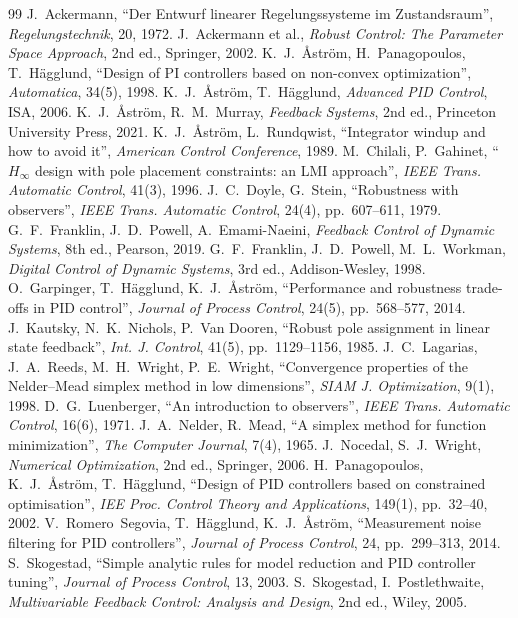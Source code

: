\documentclass[10pt,a4paper]{article}
\begin{document}
\begin{thebibliography}{99}\small
{} J.~Ackermann, ``Der Entwurf linearer Regelungssysteme im Zustandsraum'', \emph{Regelungstechnik}, 20, 1972.
 J.~Ackermann et al., \emph{Robust Control: The Parameter Space Approach}, 2nd ed., Springer, 2002.
 K.~J.~{\AA}str{\"o}m, H.~Panagopoulos, T.~H{\"a}gglund, ``Design of PI controllers based on non-convex optimization'', \emph{Automatica}, 34(5), 1998.
 K.~J.~{\AA}str{\"o}m, T.~H{\"a}gglund, \emph{Advanced PID Control}, ISA, 2006.
 K.~J.~{\AA}str{\"o}m, R.~M.~Murray, \emph{Feedback Systems}, 2nd ed., Princeton University Press, 2021.
 K.~J.~{\AA}str{\"o}m, L.~Rundqwist, ``Integrator windup and how to avoid it'', \emph{American Control Conference}, 1989.
 M.~Chilali, P.~Gahinet, ``$H_\infty$ design with pole placement constraints: an LMI approach'', \emph{IEEE Trans. Automatic Control}, 41(3), 1996.
 J.~C.~Doyle, G.~Stein, ``Robustness with observers'', \emph{IEEE Trans. Automatic Control}, 24(4), pp.~607--611, 1979.
 G.~F.~Franklin, J.~D.~Powell, A.~Emami-Naeini, \emph{Feedback Control of Dynamic Systems}, 8th ed., Pearson, 2019.
 G.~F.~Franklin, J.~D.~Powell, M.~L.~Workman, \emph{Digital Control of Dynamic Systems}, 3rd ed., Addison-Wesley, 1998.
 O.~Garpinger, T.~H{\"a}gglund, K.~J.~{\AA}str{\"o}m, ``Performance and robustness trade-offs in PID control'', \emph{Journal of Process Control}, 24(5), pp.~568--577, 2014.
 J.~Kautsky, N.~K.~Nichols, P.~Van Dooren, ``Robust pole assignment in linear state feedback'', \emph{Int. J. Control}, 41(5), pp.~1129--1156, 1985.
 J.~C.~Lagarias, J.~A.~Reeds, M.~H.~Wright, P.~E.~Wright, ``Convergence properties of the Nelder--Mead simplex method in low dimensions'', \emph{SIAM J. Optimization}, 9(1), 1998.
 D.~G.~Luenberger, ``An introduction to observers'', \emph{IEEE Trans. Automatic Control}, 16(6), 1971.
 J.~A.~Nelder, R.~Mead, ``A simplex method for function minimization'', \emph{The Computer Journal}, 7(4), 1965.
 J.~Nocedal, S.~J.~Wright, \emph{Numerical Optimization}, 2nd ed., Springer, 2006.
 H.~Panagopoulos, K.~J.~{\AA}str{\"o}m, T.~H{\"a}gglund, ``Design of PID controllers based on constrained optimisation'', \emph{IEE Proc. Control Theory and Applications}, 149(1), pp.~32--40, 2002.
 V.~Romero~Segovia, T.~H{\"a}gglund, K.~J.~{\AA}str{\"o}m, ``Measurement noise filtering for PID controllers'', \emph{Journal of Process Control}, 24, pp.~299--313, 2014.
 S.~Skogestad, ``Simple analytic rules for model reduction and PID controller tuning'', \emph{Journal of Process Control}, 13, 2003.
 S.~Skogestad, I.~Postlethwaite, \emph{Multivariable Feedback Control: Analysis and Design}, 2nd ed., Wiley, 2005.
\end{thebibliography}
\end{document}
